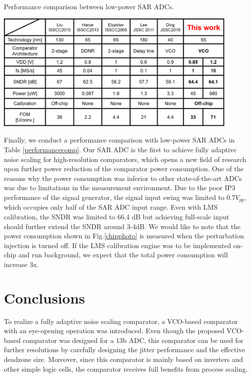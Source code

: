 \documentclass[journal]{IEEEtran}
\begin{document}
\begin{table}[!]
\centering
 \caption{Performance comparison between low-power SAR ADCs.}
 \includegraphics[width=0.9\textwidth]{figs/table.png}
  \label{performancecomp}
\end{table}

Finally, we conduct a performance comparison with low-power SAR ADCs in Table \ref{performancecomp}. Our SAR ADC is the first to achieve fully adaptive noise scaling for high-resolution comparators, which opens a new field of research upon further power reduction of the comparator power consumption. 
One of the reasons why the power consumption was inferior to other state-of-the-art ADCs was due to limitations in the measurement environment. Due to the poor IP3 performance of the signal generator, the signal input swing was limited to $0.7V_{pp}$, which occupies only half of the SAR ADC input range. Even with LMS calibration, the SNDR was limited to 66.4 dB but achieving full-scale input should further extend the SNDR around 3-4dB. We would like to note that the power consumption shown in Fig.\ref{chipphoto} is measured when the perturbation injection is turned off. If the LMS calibration engine was to be implemented on-chip and run background, we expect that the total power consumption will increase 3x. 

\section{Conclusions}
To realize a fully adaptive noise scaling comparator, a VCO-based comparator with an eye-opening operation was introduced.  Even though the proposed VCO-based comparator was designed for a 13b ADC, this comparator can be used for further resolutions by carefully designing the jitter performance and the effective deadzone size. Moreover, since this comparator is mainly based on inverters and other simple logic cells, the comparator receives full benefits from process scaling. %
\end{document}
